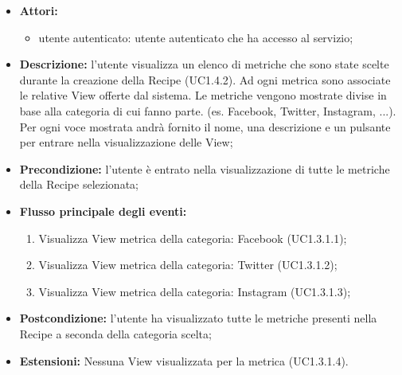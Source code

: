 \begin{itemize}
	\item \textbf{Attori:}
	\begin{itemize}
		\item utente autenticato: utente autenticato che ha accesso al servizio;
	\end{itemize}
	\item \textbf{Descrizione:} l'utente visualizza un elenco di metriche che sono state scelte durante la creazione della Recipe (UC1.4.2). Ad ogni metrica sono associate le relative View offerte dal sistema. Le metriche vengono mostrate divise in base alla categoria di cui fanno parte. (es. Facebook, Twitter, Instagram, ...). Per ogni voce mostrata andrà fornito il nome, una descrizione e un pulsante per entrare nella visualizzazione delle View;
	\item \textbf{Precondizione:} l'utente è entrato nella visualizzazione di tutte le metriche della Recipe selezionata;
	\item \textbf{Flusso principale degli eventi:}
	\begin{enumerate}
		\item Visualizza View metrica della categoria: Facebook (UC1.3.1.1);
		\item Visualizza View metrica della categoria: Twitter (UC1.3.1.2);
		\item Visualizza View metrica della categoria: Instagram (UC1.3.1.3);
	\end{enumerate}
	\item \textbf{Postcondizione:} l'utente ha visualizzato tutte le metriche presenti nella Recipe a seconda della categoria scelta;
	\item \textbf{Estensioni:} Nessuna View visualizzata per la metrica (UC1.3.1.4).
\end{itemize}

